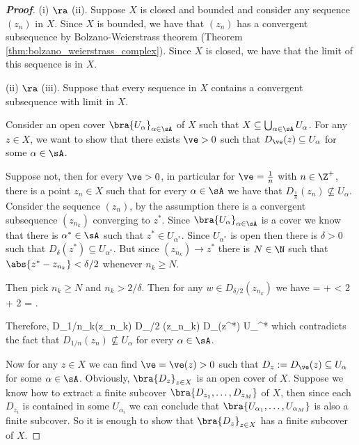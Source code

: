 \begin{proof}[\bf Proof]
\ben
\item [(i)] $\ra$ (ii). Suppose $X$ is closed and bounded and consider any sequence $(z_n)$ in $X$. Since $X$ is bounded, we have that $(z_n)$ has a convergent subsequence by Bolzano-Weierstrass theorem (Theorem \ref{thm:bolzano_weierstrass_complex}). Since $X$ is closed, we have that the limit of this sequence is in $X$.

\item [(ii)] $\ra$ (iii). Suppose that every sequence in $X$ contains a convergent subsequence with limit in $X$. 

Consider an open cover $\bra{U_\alpha}_{\alpha\in \sA}$ of $X$ such that $X\subseteq \bigcup_{\alpha\in\sA} U_{\alpha}$. For any $z\in X$, we want to show that there exists $\ve>0$ such that $D_\ve(z) \subseteq U_\alpha$ for some $\alpha\in \sA$.

Suppose not, then for every $\ve>0$, in particular for $\ve = \frac 1n$ with $n\in \Z^+$, there is a point $z_n\in X$ such that for every $\alpha\in \sA$ we have that $D_{\frac 1n}(z_n) \not\subseteq U_\alpha$. Consider the sequence $(z_n)$, by the assumption there is a convergent subsequence $(z_{n_k})$ converging to $z^*$. Since $\bra{U_{\alpha}}_{\alpha\in \sA}$ is a cover we know that there is $\alpha^* \in \sA$ such that $z^* \in U_{\alpha^*}$. Since $U_{\alpha^*}$ is open then there is $\delta >0$ such that $D_{\delta}(z^*) \subseteq U_{\alpha^*}$. But since $(z_{n_k})\to z^*$ there is $N\in \N$ such that $\abs{z^* - z_{n_k}} < \delta/2$ whenever $n_k\geq N$.
    
Then pick $n_k\geq N$ and $n_k > 2/\delta$. Then for any $w\in D_{\delta/2}(z_{n_k})$ we have
\be
{} =  \leq {} +  < \frac {\delta}2 + \frac{\delta}2 = \delta.
\ee
    
Therefore,
\be
D_{1/n_k}(z_{n_k}) \subseteq D_{\delta/2} (z_{n_k}) \subseteq D_\delta(z^*) \subseteq U_{\alpha^*}
\ee 
which contradicts the fact that $D_{1/n}(z_n) \not\subseteq U_{\alpha}$ for every $\alpha\in \sA$. 
    
Now for any $z\in X$ we can find $\ve= \ve(z)>0$ such that $D_z := D_\ve(z) \subseteq U_{\alpha}$ for some $\alpha\in \sA$. Obviously, $\bra{D_z}_{z\in X}$ is an open cover of $X$. Suppose we know how to extract a finite subcover $\bra{D_{z_1},\dots,D_{z_M}}$ of $X$, then since each $D_{z_i}$ is contained in some $U_{\alpha_i}$ we can conclude that $\bra{U_{\alpha_1},\dots,U_{\alpha_M}}$ is also a finite subcover. So it is enough to show that $\bra{D_{z}}_{z\in X}$ has a finite subcover of $X$.
    

\end{proof}
